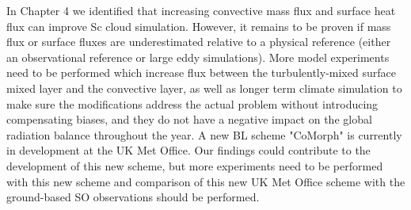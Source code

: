 In Chapter 4 we identified that increasing convective mass flux and surface
heat flux can improve Sc cloud simulation. However, it remains
to be proven if mass flux or surface fluxes are underestimated relative to
a physical reference (either an observational reference or large eddy
simulations). More model experiments need to be performed which increase
flux between the turbulently-mixed surface mixed layer and the convective layer,
as well as longer term climate simulation to make sure the modifications
address the actual problem without introducing compensating biases,
and they do not have a negative impact on the
global radiation balance throughout the year. A new BL scheme "CoMorph"
is currently in development at the UK Met Office. Our findings could contribute
to the development of this new scheme, but more experiments need to be performed
with this new scheme and comparison of this new UK Met Office scheme with the ground-based
SO observations should be performed.

\clearpage
